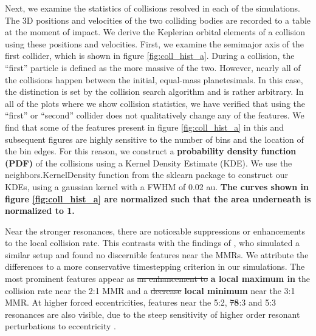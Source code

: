 \documentclass[fleqn,usenatbib]{mnras}
\begin{document}
Next, we examine the statistics of collisions resolved in each of the simulations. The 3D positions and velocities of the two colliding bodies are 
recorded to a table at the moment of impact. We derive the Keplerian orbital elements of a collision using these positions and velocities. 
First, we examine the semimajor axis of the first collider, which is shown in figure \ref{fig:coll_hist_a}. During a collision, the ``first'' particle is defined 
as the more massive of the two. However, nearly all of the collisions happen between the initial, equal-mass planetesimals. In this case, the 
distinction is set by the collision search algorithm and is rather arbitrary. In all of the plots where we show collision statistics, we have verified that 
using the ``first'' or ``second'' collider does not qualitatively change any of the features. We find that some of the features present in figure 
\ref{fig:coll_hist_a} in this and subsequent figures are highly sensitive to the number of bins and the location of the bin edges. For this reason, we 
construct a \textbf{probability density function (PDF)} of the collisions using a Kernel Density Estimate (KDE). We use the {\sc neighbors.KernelDensity} function from the {\sc sklearn} 
\citep{scikit-learn} package to construct our KDEs, using a gaussian kernel with a FWHM of 0.02 au. \textbf{The curves shown in figure \ref{fig:coll_hist_a} are normalized such that the area underneath is normalized to 1.}

Near the stronger resonances, there are noticeable suppressions or enhancements to the local collision rate. This contrasts with the findings of 
\citet{2000Icar..143...45R}, who simulated a similar setup and found no discernible features near the MMRs. We attribute the differences to a more 
conservative timestepping criterion in our simulations. The most prominent features appear as \sout{an enhancement to} \textbf{a local maximum in} the collision rate near the 2:1 
MMR and a \sout{decrease} \textbf{local minimum} near the 3:1 MMR. At higher forced eccentricities, features near the 5:2, \sout{7}\textbf{8}:3 and 5:3 resonances are also visible, due to the 
steep sensitivity of higher order resonant perturbations to eccentricity \citep{1994PhyD...77..289M}.
\end{document}
